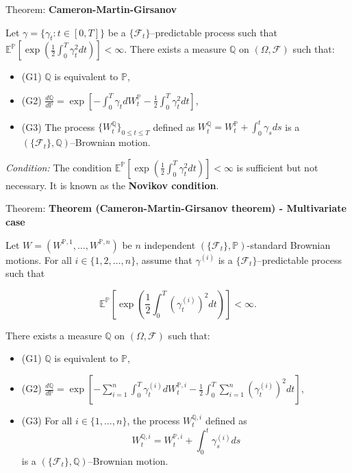 \documentclass[12pt,a4paper]{article}
\begin{document}
\vspace{1em}


Theorem: \textbf{Cameron-Martin-Girsanov}
\vspace{0.5em}

Let $\gamma = \{\gamma_t : t \in [0, T]\}$ be a $\{\mathcal{F}_t\}$--predictable process such that $\mathbb{E}^{\mathbb{P}}\left[\exp\left(\frac{1}{2}\int_0^T \gamma_t^2 dt\right)\right] < \infty$. There exists a measure $\mathbb{Q}$ on $(\Omega, \mathcal{F})$ such that:

\begin{itemize}
	\item (G1) $\mathbb{Q}$ is equivalent to $\mathbb{P}$,
	\item (G2) $\displaystyle \frac{d\mathbb{Q}}{d\mathbb{P}} = \exp\left[-\int_0^T \gamma_t dW_t^{\mathbb{P}} - \frac{1}{2}\int_0^T \gamma_t^2 dt\right]$,
	\item (G3) The process $\{W_t^{\mathbb{Q}}\}_{0 \leq t \leq T}$ defined as $W_t^{\mathbb{Q}} = W_t^{\mathbb{P}} + \int_0^t \gamma_s ds$ is a $(\{\mathcal{F}_t\}, \mathbb{Q})$--Brownian motion.
\end{itemize}

\vspace{0.5em}

\textit{Condition:} The condition $\mathbb{E}^{\mathbb{P}}\left[\exp\left(\frac{1}{2}\int_0^T \gamma_t^2 dt\right)\right] < \infty$ is sufficient but not necessary. It is known as the \textbf{Novikov condition}.

\vspace{1em}


Theorem: \textbf{Theorem (Cameron-Martin-Girsanov theorem) - Multivariate case}
\vspace{0.5em}

Let $W = (W^{\mathbb{P}, 1}, \ldots, W^{\mathbb{P}, n})$ be $n$ independent $(\{\mathcal{F}_t\}, \mathbb{P})$-standard Brownian motions. For all $i \in \{1, 2, \ldots, n\}$, assume that $\gamma^{(i)}$ is a $\{\mathcal{F}_t\}$--predictable process such that

\[
\mathbb{E}^{\mathbb{P}}\left[\exp\left(\frac{1}{2}\int_0^T \left(\gamma_t^{(i)}\right)^2 dt\right)\right] < \infty.
\]

There exists a measure $\mathbb{Q}$ on $(\Omega, \mathcal{F})$ such that:

\begin{itemize}
	\item (G1) $\mathbb{Q}$ is equivalent to $\mathbb{P}$,
	\item (G2) $\displaystyle \frac{d\mathbb{Q}}{d\mathbb{P}} = \exp\left[-\sum_{i=1}^n \int_0^T \gamma_t^{(i)} dW_t^{\mathbb{P}, i} - \frac{1}{2}\int_0^T \sum_{i=1}^n \left(\gamma_t^{(i)}\right)^2 dt\right]$,
	\item (G3) For all $i \in \{1, \ldots, n\}$, the process $W_t^{\mathbb{Q}, i}$ defined as 
	\[
	W_t^{\mathbb{Q}, i} = W_t^{\mathbb{P}, i} + \int_0^t \gamma_s^{(i)} ds
	\]
	is a $(\{\mathcal{F}_t\}, \mathbb{Q})$--Brownian motion.
\end{itemize}
\end{document}
